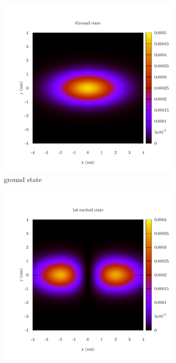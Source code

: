 \documentclass[12pt,a4]{article}
\begin{document}
\begin{figure}[H]
	\begin{subfigure}{.33\textwidth}
		\includegraphics[width=\textwidth]{../plots/y_state_0.pdf}
		\caption{ground state}
	\end{subfigure}
	\begin{subfigure}{.33\textwidth}
		\includegraphics[width=\textwidth]{../plots/y_state_1.pdf}

\end{subfigure}
\end{figure}
\end{document}
